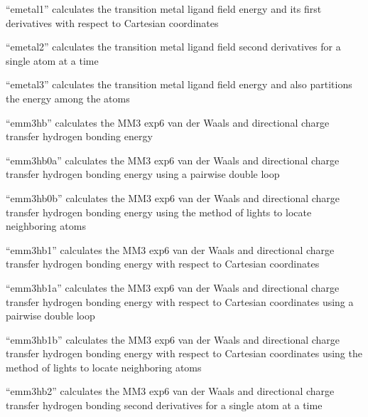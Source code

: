 \documentclass[letterpaper,11pt,english]{sphinxmanual}
\begin{document}

“emetal1” calculates the transition metal ligand field energy and its first derivatives with respect to Cartesian coordinates


“emetal2” calculates the transition metal ligand field second derivatives for a single atom at a time


“emetal3” calculates the transition metal ligand field energy and also partitions the energy among the atoms


“emm3hb” calculates the MM3 exp\sphinxhyphen{}6 van der Waals and directional charge transfer hydrogen bonding energy


“emm3hb0a” calculates the MM3 exp\sphinxhyphen{}6 van der Waals and directional charge transfer hydrogen bonding energy using a pairwise double loop


“emm3hb0b” calculates the MM3 exp\sphinxhyphen{}6 van der Waals and directional charge transfer hydrogen bonding energy using the method of lights to locate neighboring atoms


“emm3hb1” calculates the MM3 exp\sphinxhyphen{}6 van der Waals and directional charge transfer hydrogen bonding energy with respect to Cartesian coordinates


“emm3hb1a” calculates the MM3 exp\sphinxhyphen{}6 van der Waals and directional charge transfer hydrogen bonding energy with respect to Cartesian coordinates using a pairwise double loop


“emm3hb1b” calculates the MM3 exp\sphinxhyphen{}6 van der Waals and directional charge transfer hydrogen bonding energy with respect to Cartesian coordinates using the method of lights to locate neighboring atoms


“emm3hb2” calculates the MM3 exp\sphinxhyphen{}6 van der Waals and directional charge transfer hydrogen bonding second derivatives for a single atom at a time
\end{document}
